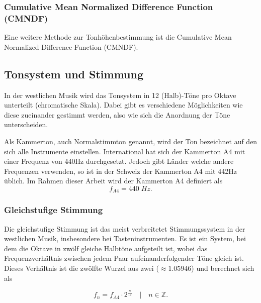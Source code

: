
\subsubsection{Cumulative Mean Normalized Difference Function (CMNDF)
\label{autotune:subsubsection:cumultativeMeanNormalizedDifferenceFunction}}
Eine weitere Methode zur Tonhöhenbestimmung ist die Cumulative Mean Normalized Difference Function (CMNDF).



\subsection{Tonsystem und Stimmung
\label{autotune:subsection:tonsystemUndStimmung}}
In der westlichen Musik wird das Tonsystem in 12 (Halb)-Töne pro Oktave unterteilt (chromatische Skala).
Dabei gibt es verschiedene Möglichkeiten wie diese zueinander gestimmt werden, also wie sich die Anordnung der Töne unterscheiden.

Als Kammerton, auch Normalstimmton genannt, wird der Ton bezeichnet auf den sich alle Instrumente einstellen.
International hat sich der Kammerton A4 mit einer Frequenz von 440\;Hz durchgesetzt.
Jedoch gibt Länder welche andere Frequenzen verwenden, so ist in der Schweiz der Kammerton A4 mit 442\;Hz üblich.
Im Rahmen dieser Arbeit wird der Kammerton A4 definiert als 
\begin{equation}
    f_{A4}
    =
    440\;Hz.
\end{equation}

\subsubsection{Gleichstufige Stimmung
\label{autotune:subsubsection:gleichstuffigeStimmung}}
Die gleichstufige Stimmung ist das meist verbreitetet Stimmungssystem in der westlichen Musik, insbesondere bei Tasteninstrumenten.
Es ist ein System, bei dem die Oktave in zwölf gleiche Halbtöne aufgeteilt ist,
wobei das Frequenzverhältnis zwischen jedem Paar aufeinanderfolgender Töne gleich ist.
Dieses Verhältnis ist die zwölfte Wurzel aus zwei ($\approx 1.05946$) und berechnet sich als

\begin{equation}
    f_n
    =
    f_{A4} \cdot 2^{\frac{n}{12}}
    \quad | \quad
    n \in \mathbb{Z}.
    \label{autotune:equation1}
    \end{equation}

